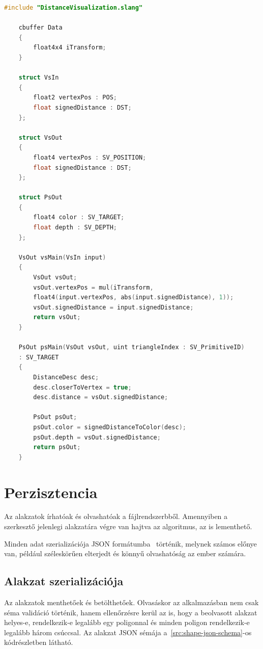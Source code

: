 \begin{lstlisting}[language=c]
	#include "DistanceVisualization.slang"

	cbuffer Data
	{
		float4x4 iTransform;
	}

	struct VsIn
	{
		float2 vertexPos : POS;
		float signedDistance : DST;
	};

	struct VsOut
	{
		float4 vertexPos : SV_POSITION;
		float signedDistance : DST;
	};

	struct PsOut
	{
		float4 color : SV_TARGET;
		float depth : SV_DEPTH;
	};

	VsOut vsMain(VsIn input)
	{
		VsOut vsOut;
		vsOut.vertexPos = mul(iTransform,
		float4(input.vertexPos, abs(input.signedDistance), 1));
		vsOut.signedDistance = input.signedDistance;
		return vsOut;
	}

	PsOut psMain(VsOut vsOut, uint triangleIndex : SV_PrimitiveID)
	: SV_TARGET
	{
		DistanceDesc desc;
		desc.closerToVertex = true;
		desc.distance = vsOut.signedDistance;

		PsOut psOut;
		psOut.color = signedDistanceToColor(desc);
		psOut.depth = vsOut.signedDistance;
		return psOut;
	}
\end{lstlisting}


\section{Perzisztencia}

Az alakzatok írhatóak és olvashatóak a fájlrendszerbből. Amennyiben a szerkesztő jelenlegi alakzatára végre van hajtva az algoritmus, az is lementhető.

Minden adat szerializációja JSON formátumba~\cite{json} történik, melynek számos előnye van, például széleskörűen elterjedt és könnyű olvashatóság az ember számára.

\subsection{Alakzat szerializációja}

Az alakzatok menthetőek és betölthetőek. Olvasáskor az alkalmazásban nem csak séma validáció történik, hanem ellenőrzésre kerül az is, hogy a beolvasott alakzat helyes-e, rendelkezik-e legalább egy poligonnal és minden poligon rendelkezik-e legalább három csúccsal. Az alakzat JSON sémája a~\ref{src:shape-json-schema}-os kódrészletben látható.

